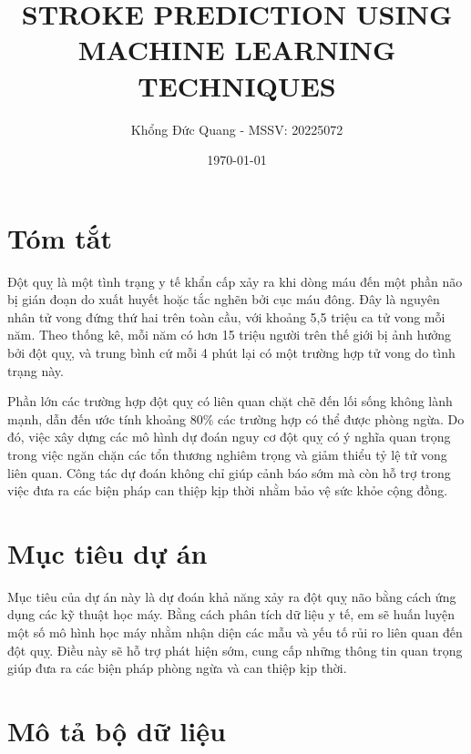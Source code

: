 \documentclass[11pt]{article}
\title{STROKE PREDICTION USING MACHINE LEARNING TECHNIQUES}
\author{Khổng Đức Quang - MSSV: 20225072}
\date{\today}
\begin{document}
	\maketitle
	
	\section{Tóm tắt}
	
	Đột quỵ là một tình trạng y tế khẩn cấp xảy ra khi dòng máu đến một phần não bị gián đoạn do xuất huyết hoặc tắc nghẽn bởi cục máu đông. Đây là nguyên nhân tử vong đứng thứ hai trên toàn cầu, với khoảng 5,5 triệu ca tử vong mỗi năm. Theo thống kê, mỗi năm có hơn 15 triệu người trên thế giới bị ảnh hưởng bởi đột quỵ, và trung bình cứ mỗi 4 phút lại có một trường hợp tử vong do tình trạng này.
	
	Phần lớn các trường hợp đột quỵ có liên quan chặt chẽ đến lối sống không lành mạnh, dẫn đến ước tính khoảng 80\% các trường hợp có thể được phòng ngừa. Do đó, việc xây dựng các mô hình dự đoán nguy cơ đột quỵ có ý nghĩa quan trọng trong việc ngăn chặn các tổn thương nghiêm trọng và giảm thiểu tỷ lệ tử vong liên quan. Công tác dự đoán không chỉ giúp cảnh báo sớm mà còn hỗ trợ trong việc đưa ra các biện pháp can thiệp kịp thời nhằm bảo vệ sức khỏe cộng đồng.
	
	\vspace{0.3cm}
	
	\section{Mục tiêu dự án}
	
	Mục tiêu của dự án này là dự đoán khả năng xảy ra đột quỵ não bằng cách ứng dụng các kỹ thuật học máy. Bằng cách phân tích dữ liệu y tế, em sẽ huấn luyện một số mô hình học máy nhằm nhận diện các mẫu và yếu tố rủi ro liên quan đến đột quỵ. Điều này sẽ hỗ trợ phát hiện sớm, cung cấp những thông tin quan trọng giúp đưa ra các biện pháp phòng ngừa và can thiệp kịp thời.
	\pagebreak
	
	\tableofcontents
	
	
	\pagebreak
	
	\listoffigures
	
	\pagebreak
	\section{Mô tả bộ dữ liệu}
	
\end{document}
